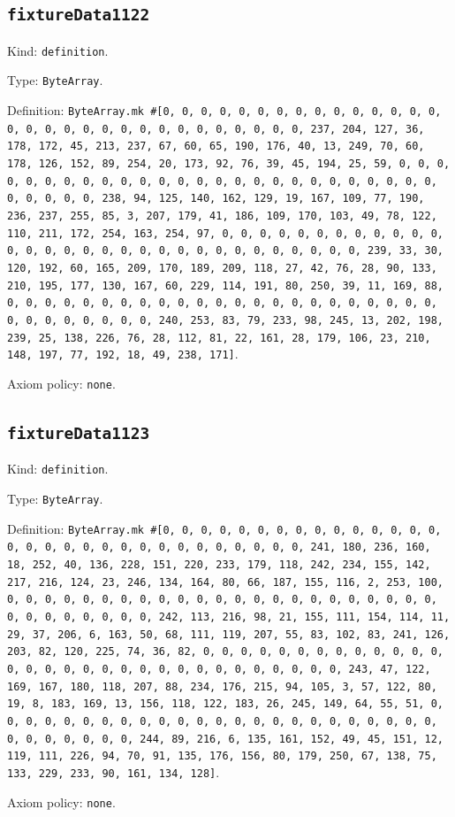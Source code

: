 \documentclass[11pt]{article}
\begin{document}
\subsection*{\texttt{fixtureData1122}}
\noindent Kind: \texttt{definition}.\par
\noindent Type: \texttt{ByteArray}.\par
\noindent Definition: \texttt{ByteArray.mk \#[0, 0, 0, 0, 0, 0, 0, 0, 0, 0, 0, 0, 0, 0, 0, 0, 0, 0, 0, 0, 0, 0, 0, 0, 0, 0, 0, 0, 0, 0, 0, 237, 204, 127, 36, 178, 172, 45, 213, 237, 67, 60, 65, 190, 176, 40, 13, 249, 70, 60, 178, 126, 152, 89, 254, 20, 173, 92, 76, 39, 45, 194, 25, 59, 0, 0, 0, 0, 0, 0, 0, 0, 0, 0, 0, 0, 0, 0, 0, 0, 0, 0, 0, 0, 0, 0, 0, 0, 0, 0, 0, 0, 0, 0, 0, 238, 94, 125, 140, 162, 129, 19, 167, 109, 77, 190, 236, 237, 255, 85, 3, 207, 179, 41, 186, 109, 170, 103, 49, 78, 122, 110, 211, 172, 254, 163, 254, 97, 0, 0, 0, 0, 0, 0, 0, 0, 0, 0, 0, 0, 0, 0, 0, 0, 0, 0, 0, 0, 0, 0, 0, 0, 0, 0, 0, 0, 0, 0, 0, 239, 33, 30, 120, 192, 60, 165, 209, 170, 189, 209, 118, 27, 42, 76, 28, 90, 133, 210, 195, 177, 130, 167, 60, 229, 114, 191, 80, 250, 39, 11, 169, 88, 0, 0, 0, 0, 0, 0, 0, 0, 0, 0, 0, 0, 0, 0, 0, 0, 0, 0, 0, 0, 0, 0, 0, 0, 0, 0, 0, 0, 0, 0, 0, 240, 253, 83, 79, 233, 98, 245, 13, 202, 198, 239, 25, 138, 226, 76, 28, 112, 81, 22, 161, 28, 179, 106, 23, 210, 148, 197, 77, 192, 18, 49, 238, 171]}.\par
\noindent Axiom policy: \texttt{none}.\par
\subsection*{\texttt{fixtureData1123}}
\noindent Kind: \texttt{definition}.\par
\noindent Type: \texttt{ByteArray}.\par
\noindent Definition: \texttt{ByteArray.mk \#[0, 0, 0, 0, 0, 0, 0, 0, 0, 0, 0, 0, 0, 0, 0, 0, 0, 0, 0, 0, 0, 0, 0, 0, 0, 0, 0, 0, 0, 0, 0, 241, 180, 236, 160, 18, 252, 40, 136, 228, 151, 220, 233, 179, 118, 242, 234, 155, 142, 217, 216, 124, 23, 246, 134, 164, 80, 66, 187, 155, 116, 2, 253, 100, 0, 0, 0, 0, 0, 0, 0, 0, 0, 0, 0, 0, 0, 0, 0, 0, 0, 0, 0, 0, 0, 0, 0, 0, 0, 0, 0, 0, 0, 0, 0, 242, 113, 216, 98, 21, 155, 111, 154, 114, 11, 29, 37, 206, 6, 163, 50, 68, 111, 119, 207, 55, 83, 102, 83, 241, 126, 203, 82, 120, 225, 74, 36, 82, 0, 0, 0, 0, 0, 0, 0, 0, 0, 0, 0, 0, 0, 0, 0, 0, 0, 0, 0, 0, 0, 0, 0, 0, 0, 0, 0, 0, 0, 0, 0, 243, 47, 122, 169, 167, 180, 118, 207, 88, 234, 176, 215, 94, 105, 3, 57, 122, 80, 19, 8, 183, 169, 13, 156, 118, 122, 183, 26, 245, 149, 64, 55, 51, 0, 0, 0, 0, 0, 0, 0, 0, 0, 0, 0, 0, 0, 0, 0, 0, 0, 0, 0, 0, 0, 0, 0, 0, 0, 0, 0, 0, 0, 0, 0, 244, 89, 216, 6, 135, 161, 152, 49, 45, 151, 12, 119, 111, 226, 94, 70, 91, 135, 176, 156, 80, 179, 250, 67, 138, 75, 133, 229, 233, 90, 161, 134, 128]}.\par
\noindent Axiom policy: \texttt{none}.\par
\end{document}
